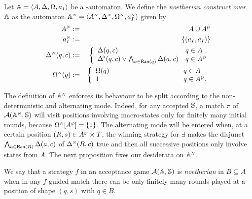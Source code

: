 \begin{definition}\label{def:noetherianconstruct}
Let $\mathbb{A} = \langle{A,\Delta,\Omega,a_I}\rangle$ be a {\nmso-automaton}. We define the \emph{noetherian construct over $\mathbb{A}$} as the automaton $\mathbb{A}^{{\scriptscriptstyle N}} = \langle{A^{{\scriptscriptstyle N}},\Delta^{{\scriptscriptstyle N}},\Omega^{{\scriptscriptstyle N}},a_I^{{\scriptscriptstyle N}}}\rangle$ given by %
\begin{eqnarray*}
        A^{\noet} &:=& A \cup \shA \\
        a_I^{\noet} &:=& \{(a_I,a_I)\}\\
        \tmap^{\noet}(q,c) &:=& \left\{
	\begin{array}{ll}
        \tmap(q,c) & q\in A \\
		\bmDe(q,c) \vee \bigwedge_{a \in \Ran(q)} \tmap(a,c) & q \in \shA
	\end{array}
\right.\\
        \pmap^{\noet}(q) &:=& \left\{
	\begin{array}{ll}
        \pmap(q) & \hspace{3.43cm} q\in A \\
		1 & \hspace{3.43cm} q \in \shA.
	\end{array}
\right.
\end{eqnarray*}%
\end{definition}
The definition of $\mathbb{A}^{{\scriptscriptstyle N}}$ enforces its behaviour to be split according to the non-deterministic and alternating mode. Indeed, for any accepted $\mathbb{S}$, a match $\pi$ of $\mathcal{A}(\mathbb{A}^{{\scriptscriptstyle N}},\mathbb{S})$ will visit positions involving macro-states only for finitely many initial rounds, because $\Omega^{{\scriptscriptstyle N}}[A^{\wp}] = \{1\}$. The alternating mode will be entered when, at a certain position $(R,s)\in A^{\wp} \times T$, the winning strategy for $\exists$ makes the disjunct $\bigwedge_{a \in \mathsf{Ran}(R)} \Delta(a,c)$ of $\Delta^{{\scriptscriptstyle N}}(R,c)$ true and then all successive positions only involve states from $A$. The next proposition fixes our desiderata on $\mathbb{A}^{{\scriptscriptstyle N}}$. 

\begin{definition}\label{def:noetherianstrategy}
We say that a strategy $f$ in an acceptance game $\mathcal{A}(\mathbb{A},\mathbb{S})$ is \emph{noetherian} in $B \subseteq A$ when in any $f$-guided match there can be only finitely many rounds played at a position of shape $(q,s)$ with $q \in B$.
\end{definition}

